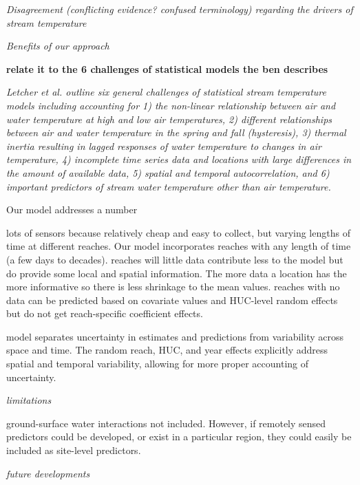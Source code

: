 \documentclass[]{article}
\begin{document}
\emph{Disagreement (conflicting evidence? confused terminology)
regarding the drivers of stream temperature}

\emph{Benefits of our approach}

\textbf{relate it to the 6 challenges of statistical models the ben
describes}

\emph{Letcher et al. \citeyearpar{Letcher2015} outline six general
challenges of statistical stream temperature models including accounting
for 1) the non-linear relationship between air and water temperature at
high and low air temperatures, 2) different relationships between air
and water temperature in the spring and fall (hysteresis), 3) thermal
inertia resulting in lagged responses of water temperature to changes in
air temperature, 4) incomplete time series data and locations with large
differences in the amount of available data, 5) spatial and temporal
autocorrelation, and 6) important predictors of stream water temperature
other than air temperature.}

Our model addresses a number

lots of sensors because relatively cheap and easy to collect, but
varying lengths of time at different reaches. Our model incorporates
reaches with any length of time (a few days to decades). reaches will
little data contribute less to the model but do provide some local and
spatial information. The more data a location has the more informative
so there is less shrinkage to the mean values. reaches with no data can
be predicted based on covariate values and HUC-level random effects but
do not get reach-specific coefficient effects.

model separates uncertainty in estimates and predictions from
variability across space and time. The random reach, HUC, and year
effects explicitly address spatial and temporal variability, allowing
for more proper accounting of uncertainty.

\emph{limitations}

ground-surface water interactions not included. However, if remotely
sensed predictors could be developed, or exist in a particular region,
they could easily be included as site-level predictors.

\emph{future developments}
\end{document}
